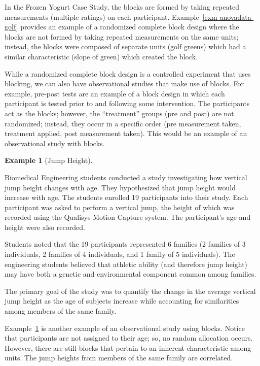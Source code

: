 \documentclass[
  letterpaper,
  DIV=11,
  numbers=noendperiod]{scrreprt}
\theoremstyle{definition}
\theoremstyle{definition}
\newtheorem{example}{Example}[chapter]
\theoremstyle{plain}
\theoremstyle{remark}
\begin{document}
In the Frozen Yogurt Case Study, the blocks are formed by taking
repeated measurements (multiple ratings) on each participant.
Example~\ref{exm-anovadata-golf} provides an example of a randomized
complete block design where the blocks are not formed by taking repeated
measurements on the same units; instead, the blocks were composed of
separate units (golf greens) which had a similar characteristic (slope
of green) which created the block.

While a randomized complete block design is a controlled experiment that
uses blocking, we can also have observational studies that make use of
blocks. For example, pre-post tests are an example of a block design in
which each participant is tested prior to and following some
intervention. The participants act as the blocks; however, the
``treatment'' groups (pre and post) are not randomized; instead, they
occur in a specific order (pre measurement taken, treatment applied,
post measurement taken). This would be an example of an observational
study with blocks.

\begin{example}[Jump
Height]\protect\hypertarget{exm-blockdata-jumpheight}{}\label{exm-blockdata-jumpheight}

Biomedical Engineering students conducted a study investigating how
vertical jump height changes with age. They hypothesized that jump
height would increase with age. The students enrolled 19 participants
into their study. Each participant was asked to perform a vertical jump,
the height of which was recorded using the Qualisys Motion Capture
system. The participant's age and height were also recorded.

Students noted that the 19 participants represented 6 families (2
families of 3 individuals, 2 families of 4 individuals, and 1 family of
5 individuals). The engineering students believed that athletic ability
(and therefore jump height) may have both a genetic and environmental
component common among families.

The primary goal of the study was to quantify the change in the average
vertical jump height as the age of subjects increase while accounting
for similarities among members of the same family.

\end{example}

Example~\ref{exm-blockdata-jumpheight} is another example of an
observational study using blocks. Notice that participants are not
assigned to their age; so, no random allocation occurs. However, there
are still blocks that pertain to an inherent characteristic among units.
The jump heights from members of the same family are correlated.
\end{document}

